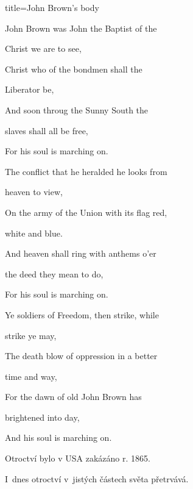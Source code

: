 \begin{song}{title=\predtitle \centering John Brown's body \\\large  }
{\begin{centerjustified}
\begin{varwidth}[t]{0.5\textwidth}



\end{varwidth}\begin{varwidth}[t]{0.55\textwidth}\setlength{\parindent}{\pindent}
\vspace*{0.03cm}


\sloka
John Brown was John the Baptist of the

Christ we are to see,

Christ who of the bondmen shall the

Liberator be,

And soon throug the Sunny South the

slaves shall all be free,

For his soul is marching on.



\sloka
The conflict that he heralded he looks from

heaven to view,

On the army of the Union with its flag red,

white and blue.

And heaven shall ring with anthems o’er

the deed they mean to do,

For his soul is marching on.


\sloka
Ye soldiers of Freedom, then strike, while

strike ye may,

The death blow of oppression in a better

time and way,

For the dawn of old John Brown has

brightened into day,

And his soul is marching on.


\hrulefill

\vspace*{.1cm}

\begin{varwidth}{.5\textwidth}
Otroctví bylo v USA zakázáno r. 1865.

I~dnes otroctví v~jistých částech světa přetrvává.


\end{varwidth}
\end{varwidth}
\end{centerjustified}}
\end{song}
